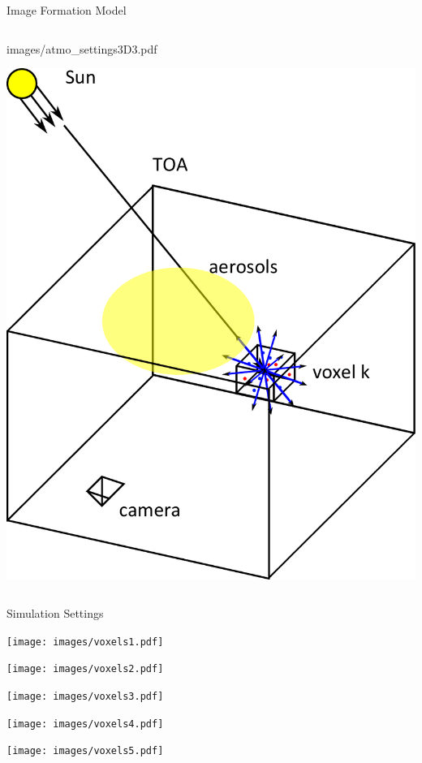 \documentclass[compress,red,12pt]{beamer}
\begin{document}
\begin{frame}{Image Formation Model}
\begin{columns}[c]
\begin{overprint}
{{          {images/atmo_settings3D3.pdf}}}
       {\centerline{\includegraphics[width=\columnwidth]
          {images/atmo_settings3D5.pdf}}}
    \end{overprint}

  \end{columns}
\end{frame}


\begin{frame}{Simulation Settings}
  \begin{center}
    \begin{overlayarea}{\columnwidth}{8cm}
        {\centerline{\texttt{[image: images/voxels1.pdf]}}}
        {\centerline{\texttt{[image: images/voxels2.pdf]}}}
        {\centerline{\texttt{[image: images/voxels3.pdf]}}}
        {\centerline{\texttt{[image: images/voxels4.pdf]}}}
        {\centerline{\texttt{[image: images/voxels5.pdf]}}}
    \end{overlayarea}
  \end{center}
\end{frame}
\end{document}
